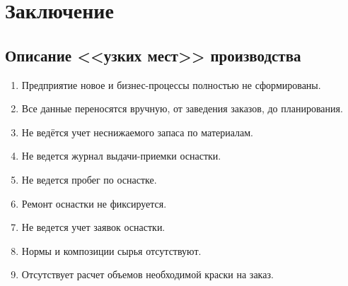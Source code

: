 \newpage

\chapter{Заключение}

\section{Описание <<узких мест>> производства}



\begin{enumerate}

\item Предприятие новое и бизнес-процессы полностью не сформированы.

\item Все данные переносятся вручную, от заведения заказов, до планирования.

\item 	Не ведётся учет неснижаемого запаса по материалам.

\item 	Не ведется журнал выдачи-приемки оснастки.

\item 	Не ведется пробег по оснастке.

\item  Ремонт оснастки не фиксируется.
 
\item  Не ведется учет заявок оснастки.
 
 \item  Нормы и композиции сырья отсутствуют.
 
 \item  Отсутствует расчет объемов необходимой краски на заказ.
 





\end{enumerate}
